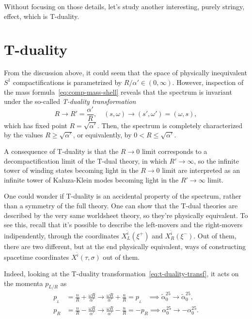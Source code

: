 Without focusing on those details, let's study another interesting, purely stringy, effect, which is T-duality.

\section{T-duality}\label{sec:t-duality}
From the discussion above, it could seem that the space of physically inequivalent $S^1$ compactifications is parametrized by $R/\alpha' \in (0,\infty)$. However, inspection of the mass formula~\eqref{eq:comp-mass-shell} reveals that the spectrum is invariant under the so-called \emph{T-duality transformation}
\begin{equation}\label{eq:t-duality-transf}
    R \to R' = \frac{\alpha'}{R}, \quad (s,\omega) \to (s',\omega') = (\omega, s) ,
\end{equation}
which has fixed point $R = \sqrt{\alpha'}$. Then, the spectrum is completely characterized by the values $R \geq \sqrt{\alpha'}$, or equivalently, by $0 < R \leq \sqrt{\alpha'}$.

A consequence of T-duality is that the $R \to 0$ limit corresponds to a decompactification limit of the T-dual theory, in which $R' \to \infty$, so the infinite tower of winding states becoming light in the $R \to 0$ limit are interpreted as an infinite tower of Kaluza-Klein modes becoming light in the $R' \to \infty$ limit.


One could wonder if T-duality is an accidental property of the spectrum, rather than a symmetry of the full theory. One can show that the T-dual theories are described by the very same worldsheet theory, so they're physically equivalent. To see this, recall that it's possible to describe the left-movers and the right-movers indipendently, through the coordinates $X^{\hat{i}}_L(\xi^+)$ and $X^{\hat{i}}_R(\xi^-)$. Out of them, there are two different, but at the end physically equivalent, ways of constructing spacetime coordinates $X^{\hat{i}}(\tau,\sigma)$ out of them. 

Indeed, looking at the T-duality transformation~\eqref{eq:t-duality-transf}, it acts on the momenta $p_{L/R}$ as
\begin{equation}\label{eq:t-duality-momenta}
\begin{aligned}
    p_{\!_L} &= \frac{n}{R} + \frac{\omega R}{\alpha'} \to \frac{\omega R}{\alpha'} + \frac{n}{R} = p_{\!_L} \; \; \; \implies \tilde{\alpha}^{25}_0 \to \tilde{\alpha}^{25}_0 ,\\
    p_R &= \frac{n}{R} - \frac{\omega R}{\alpha'} \to \frac{\omega R}{\alpha'} - \frac{n}{R} = - p_R \implies {\alpha}^{25}_0 \to -{\alpha}^{25}_0 .
\end{aligned}
\end{equation}

